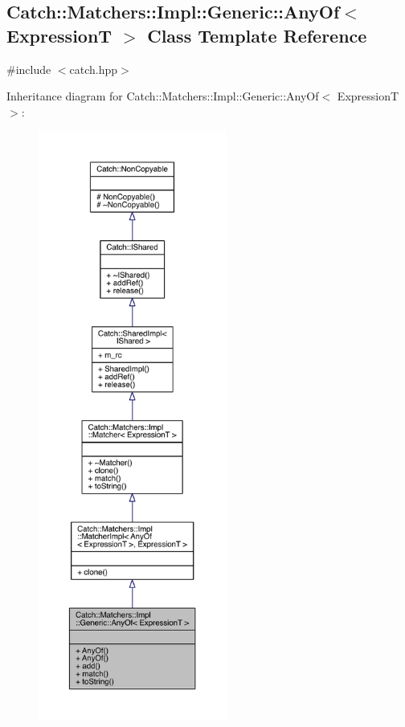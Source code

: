 \hypertarget{a00002}{}\subsection{Catch\+:\+:Matchers\+:\+:Impl\+:\+:Generic\+:\+:Any\+Of$<$ Expression\+T $>$ Class Template Reference}
\label{a00002}


{\ttfamily \#include $<$catch.\+hpp$>$}



Inheritance diagram for Catch\+:\+:Matchers\+:\+:Impl\+:\+:Generic\+:\+:Any\+Of$<$ Expression\+T $>$\+:\nopagebreak
\begin{figure}[H]
\begin{center}
\leavevmode
\includegraphics[height=550pt]{a00345}
\end{center}
\end{figure}


